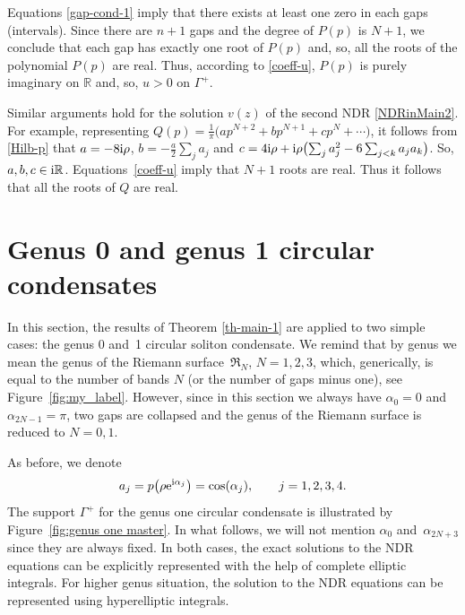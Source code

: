 \documentclass[10pt,a4paper]{amsart}
\numberwithin{equation}{section}
\newcommand{\G}{\Gamma}
\def\R{{\mathbb R}}
\def\a{\alpha}
\def\r{\rho}
\def\G{\Gamma}
\def\r{\rho}
\begin{document}
Equations \eqref{gap-cond-1} imply
that there exists at least one zero in each gaps (intervals). Since there are $n+1$ gaps and the degree of $P(p)$ is $N+1$, we conclude that each gap has exactly one root of $P(p)$ and, so, all the roots of the polynomial $P(p)$ are real. Thus, according to \eqref{coeff-u}, $P(p)$ is purely imaginary on $\R$ and, so, $u>0$ on $\G^+$.

Similar arguments hold for the solution $v(z)$ of the second NDR \eqref{NDRinMain2}.
For example, representing $Q(p)=\frac{1}{\pi}\bigl(ap^{N+2}+bp^{N+1}+cp^N+\cdots\bigr)$, it follows from \eqref{Hilb-p} that $a=-8{\rm i}\r $, $b=-\frac a2 \sum_j a_j$ and $c=4{\rm i}\r +{\rm i}\r \bigl(\sum_{j}a_j^2-6\sum_{j<k}a_ja_k\bigr)$. So, $a,b,c\in {\rm i}\R$. Equations~\eqref{coeff-u} imply that $N+1$ roots are real. Thus it follows that all the roots of $Q$ are real.

\section{Genus 0 and genus 1 circular condensates}\label{s3}
In this section, the results of Theorem \ref{th-main-1} are applied to two simple cases: the genus 0 and~1 circular soliton condensate.
We remind that by genus we mean the genus of the Riemann surface~$\mathfrak R_N$, $N=1,2,3$, which, generically, is equal to the number of bands $N$ (or the number of gaps minus one), see Figure~\ref{fig:my_label}.
However, since in this section we always have $\alpha_0=0$ and $\alpha_{2N-1}=\pi$, two gaps are collapsed and the genus of the Riemann surface is reduced to $N=0,1$.

As before, we denote
\[
a_j=p\bigl(\r {\rm e}^{{\rm i}\a_j}\bigr)=\cos(\alpha_j), \qquad j=1,2,3,4.
\]
 The support $\G^+$ for the genus one circular condensate is illustrated by Figure~\ref{fig:genus one master}. In what follows, we will not mention $\a_0$ and~$\a_{2N+3}$ since they are always fixed.
In both cases, the exact solutions to the NDR equations can be explicitly represented with the help of complete elliptic integrals. For higher genus situation, the solution to the NDR equations can be represented using hyperelliptic integrals.
\end{document}
